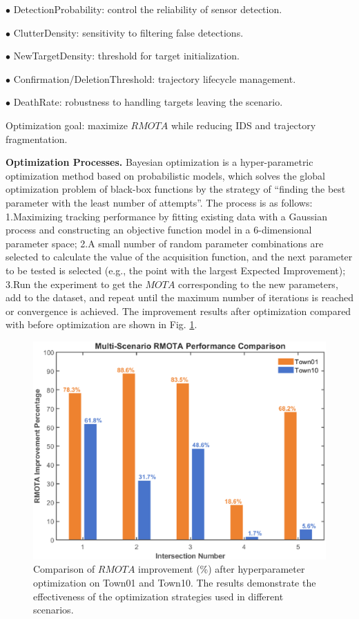 \documentclass[journal,twoside,web]{ieeecolor}
\begin{document}
\(\bullet\) DetectionProbability: control the reliability of sensor detection.

\(\bullet\) ClutterDensity: sensitivity to filtering false detections.

\(\bullet\) NewTargetDensity: threshold for target initialization.

\(\bullet\) Confirmation/DeletionThreshold: trajectory lifecycle management.

\(\bullet\) DeathRate: robustness to handling targets leaving the scenario.

Optimization goal: maximize \(RMOTA\) while reducing IDS and trajectory fragmentation.

\textbf{Optimization Processes.}
Bayesian optimization is a hyper-parametric optimization method based on probabilistic models, which solves the global optimization problem of black-box functions by the strategy of “finding the best parameter with the least number of attempts”.
The process is as follows:
1.Maximizing tracking performance by fitting existing data with a Gaussian process and constructing an objective function model in a 6-dimensional parameter space; 
2.A small number of random parameter combinations are selected to calculate the value of the acquisition function, and the next parameter to be tested is selected (e.g., the point with the largest Expected Improvement); 
3.Run the experiment to get the \(MOTA\) corresponding to the new parameters, add to the dataset, and repeat until the maximum number of iterations is reached or convergence is achieved.
The improvement results after optimization compared with before optimization are shown in Fig. \ref{fig4}.   
\begin{figure}[!t]
	\centerline{\includegraphics[width=\columnwidth]{picture/picture4.eps}}
	\caption{Comparison of \(RMOTA\) improvement (\%) after hyperparameter optimization on Town01 and Town10. The results demonstrate the effectiveness of the optimization strategies used in different scenarios.} 
	\label{fig4} 
\end{figure}
\end{document}
